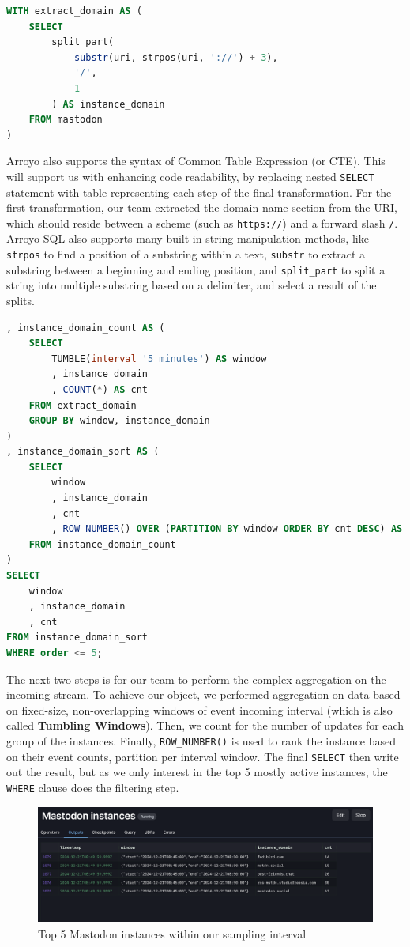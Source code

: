 \begin{lstlisting}[language=SQL]
WITH extract_domain AS (
    SELECT
        split_part(
            substr(uri, strpos(uri, '://') + 3),
            '/',
            1
        ) AS instance_domain
    FROM mastodon
)
\end{lstlisting}

Arroyo also supports the syntax of Common Table Expression (or CTE). This will support us with
enhancing code readability, by replacing nested \texttt{SELECT} statement with table representing
each step of the final transformation. For the first transformation, our team extracted the domain
name section from the URI, which should reside between a scheme (such as \texttt{https://}) and a
forward slash \texttt{/}. Arroyo SQL also supports many built-in string manipulation methods, like
\texttt{strpos} to find a position of a substring within a text, \texttt{substr} to extract a
substring between a beginning and ending position, and \texttt{split\_part} to split a string into
multiple substring based on a delimiter, and select a result of the splits.

\begin{lstlisting}[language=SQL]
, instance_domain_count AS (
    SELECT
        TUMBLE(interval '5 minutes') AS window
        , instance_domain
        , COUNT(*) AS cnt
    FROM extract_domain
    GROUP BY window, instance_domain
)
, instance_domain_sort AS (
    SELECT
        window
        , instance_domain
        , cnt
        , ROW_NUMBER() OVER (PARTITION BY window ORDER BY cnt DESC) AS order
    FROM instance_domain_count
)
SELECT
    window
    , instance_domain
    , cnt
FROM instance_domain_sort
WHERE order <= 5;
\end{lstlisting}

The next two steps is for our team to perform the complex aggregation on the incoming stream. To
achieve our object, we performed aggregation on data based on fixed-size, non-overlapping windows of
event incoming interval (which is also called \textbf{Tumbling Windows}). Then, we count for the
number of updates for each group of the instances. Finally, \texttt{ROW\_NUMBER()} is used to rank
the instance based on their event counts, partition per interval window. The final \texttt{SELECT}
then write out the result, but as we only interest in the top 5 mostly active instances, the
\texttt{WHERE} clause does the filtering step.

\begin{figure}[H]
    \centering
    \includegraphics[width=\textwidth]{Images/mastodon_instance_count.png}
    \vspace{1em}
    \caption{Top 5 Mastodon instances within our sampling interval}
    \label{fig:mastodon_instance_count}
\end{figure}

